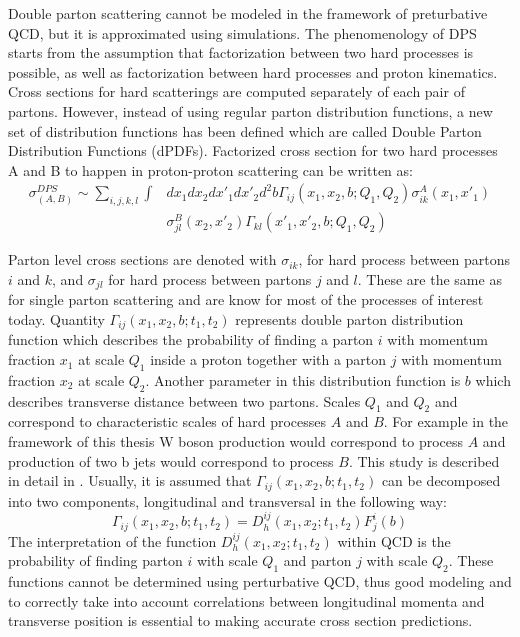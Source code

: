 \par Double parton scattering cannot be modeled in the framework of preturbative QCD, but it is approximated using simulations. The phenomenology of DPS starts from the assumption that factorization between two hard processes is possible, as well as factorization between hard processes and proton kinematics. Cross sections for hard scatterings are computed separately of each pair of partons. However, instead of using regular parton distribution functions, a new set of distribution functions has been defined which are called Double Parton Distribution Functions (dPDFs). Factorized cross section for two hard processes A and B to happen in proton-proton scattering can be written as:
\begin{equation}
\begin{split}
\sigma_{(A,B)}^{DPS} \sim \sum\limits_{i,j,k,l} \int & dx_1 dx_2  dx'_1 dx'_2 d^2b  \Gamma_{ij}(x_1,x_2,b;Q_1,Q_2)\sigma_{ik}^A(x_1,x'_1) \\
 & \sigma_{jl}^B(x_2,x'_2) \Gamma_{kl}(x'_1,x'_2,b;Q_1,Q_2)
\end{split}
\end{equation}
\par Parton level cross sections are denoted with $\sigma_{ik}$, for hard process between partons $i$ and $k$, and $\sigma_{jl}$ for hard process between partons $j$ and $l$. These are the same as for single parton scattering and are know for most of the processes of interest today. Quantity $\Gamma_{ij}(x_1,x_2,b;t_1,t_2)$ represents double parton distribution function which describes the probability of finding a parton $i$ with momentum fraction $x_1$ at scale $Q_1$ inside a proton together with a parton $j$ with momentum fraction $x_2$ at scale $Q_2$. Another parameter in this distribution function is $b$ which describes transverse distance between two partons. Scales $Q_1$ and $Q_2$ and correspond to characteristic scales of hard processes $A$ and $B$. For example in the framework of this thesis W boson production would correspond to process $A$ and production of two b jets would correspond to process $B$. This study is described in detail in \cite{Quackenbush:2011bf}. Usually, it is assumed that $\Gamma_{ij}(x_1,x_2,b;t_1,t_2)$ can be decomposed into two components, longitudinal and transversal in the following way:
\begin{equation}
\Gamma_{ij}(x_1,x_2,b;t_1,t_2) = D^{ij}_h(x_1,x_2;t_1,t_2)F_j^i(b)
\end{equation} 
The interpretation of the function $D^{ij}_h(x_1,x_2;t_1,t_2)$ within QCD is the probability of finding parton $i$ with scale $Q_1$ and parton $j$ with scale $Q_2$. These functions cannot be determined using perturbative QCD, thus good modeling and to correctly take into account correlations between longitudinal momenta and transverse position is essential to making accurate cross section predictions. 
